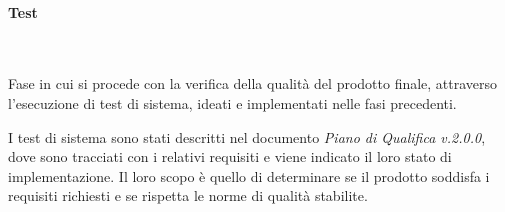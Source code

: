 \paragraph{Test}~

\noindent Fase in cui si procede con la verifica della qualità del prodotto finale, attraverso l'esecuzione di test di sistema, ideati e implementati nelle fasi precedenti.

I test di sistema sono stati descritti nel documento \textit{Piano di Qualifica v.2.0.0}, dove sono tracciati con i relativi requisiti e viene indicato il loro stato di implementazione.
Il loro scopo è quello di determinare se il prodotto soddisfa i requisiti richiesti e se rispetta le norme di qualità stabilite.

